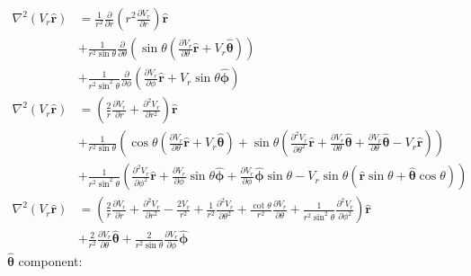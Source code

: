 \documentclass[MSc,beforeExam]{iitcsthesis}
\newcommand{\deriv}[2]{\frac{\partial #1}{\partial #2}}
\newcommand\Laplacian{\nabla^2}
\newcommand\br{\boldsymbol{r}}
\newcommand\brhat{\hat{\br}}
\newcommand\btheta{\boldsymbol{\theta}}
\newcommand\bthetahat{\hat{\btheta}}
\newcommand\bphi{\boldsymbol{\phi}}
\newcommand\bphihat{\hat{\bphi}}
\begin{document}
\begin{align}
\Laplacian (V_r\brhat) &= \nonumber
\frac{1}{r^2}\deriv{}{r}\left(r^2 \deriv{V_r}{r}\right)\brhat
\\ &+ \nonumber
\frac{1}{r^2\sin\theta}\deriv{}{\theta}\left(
\sin\theta\left(\deriv{V_r}{\theta}\brhat + V_r\bthetahat \right)\right)
\\ &+ \nonumber
\frac{1}{r^2 \sin^2\theta}\deriv{}{\phi}\left(
\deriv{V_r}{\phi}\brhat + V_r \sin\theta\bphihat
\right) \\
\Laplacian (V_r\brhat) &= 
\left(
\frac{2}{r}\deriv{V_r}{r}+\deriv{^2V_r}{r^2}\right)\brhat
\\ &+ \nonumber
\frac{1}{r^2\sin\theta}\left(
\cos\theta\left(\deriv{V_r}{\theta}\brhat + V_r\bthetahat \right) +
\sin\theta\left(\deriv{^2V_r}{\theta^2}\brhat + \deriv{V_r}{\theta}\bthetahat + \deriv{V_r}{\theta}\bthetahat - V_r\brhat\right)
\right)
\\ &+ \nonumber
\frac{1}{r^2 \sin^2\theta}\left(
\deriv{^2V_r}{\phi^2}\brhat + \deriv{V_r}{\phi} \sin\theta\bphihat +
\deriv{V_r}{\phi}\bphihat\sin\theta - V_r \sin\theta
\left(\brhat \sin\theta + \bthetahat \cos\theta \right)
\right)
\\ \nonumber
\Laplacian (V_r\brhat) &=
\left(
\frac{2}{r}\deriv{V_r}{r}+\deriv{^2V_r}{r^2}-\frac{2V_r}{r^2}
+ \frac{1}{r^2}\deriv{^2V_r}{\theta^2}
+ \frac{\cot\theta}{r^2} \deriv{V_r}{\theta}
+ \frac{1}{r^2 \sin^2\theta} \deriv{^2V_r}{\phi^2}
\right)\brhat
\\ &+ \frac{2}{r^2} \deriv{V_r}{\theta} \bthetahat + \frac{2}{r^2 \sin\theta}\deriv{V_r}{\phi} \bphihat
\nonumber
\end{align}
$\bthetahat$ component:
\end{document}
